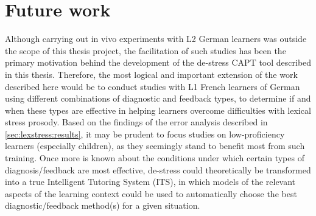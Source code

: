 % 
% 
 
 


\section{Future work}
\label{sec:conclusion:future}

Although carrying out in vivo experiments with L2 German learners was outside the scope of this thesis project, the facilitation of such studies has been the primary motivation behind the development of the de-stress CAPT tool described in this thesis. Therefore, the most logical and important extension of the work described here would be to conduct studies with L1 French learners of German using different combinations of diagnostic and feedback types, to determine if and when these types are effective in helping learners overcome difficulties with lexical stress prosody. 
	Based on the findings of the error analysis described in \cref{sec:lexstress:results}, it may be prudent to focus studies on low-proficiency learners (especially children), as they seemingly stand to benefit most from such training.
	Once more is known about the conditions under which certain types of diagnosis/feedback are most effective, de-stress could theoretically be transformed into a true Intelligent Tutoring System (ITS), in which models of the relevant aspects of the learning context could be used to automatically choose the best diagnostic/feedback method(s) for a given situation.

